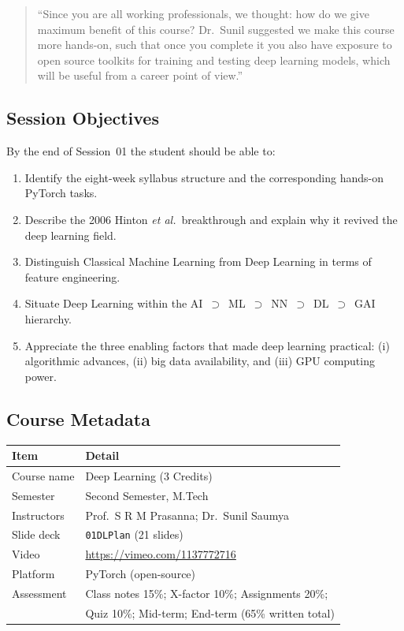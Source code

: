 \documentclass[12pt,a4paper]{article}
\begin{document}
\begin{quote}
``Since you are all working professionals, we thought: how do we give
maximum benefit of this course?  Dr.\ Sunil suggested we make this course
more hands-on, such that once you complete it you also have exposure to open
source toolkits for training and testing deep learning models, which will be
useful from a career point of view.''
\end{quote}

\subsection{Session Objectives}
\label{subsec:objectives}

By the end of Session~01 the student should be able to:
\begin{enumerate}[label=\textbf{O\arabic*.}]
  \item Identify the eight-week syllabus structure and the corresponding
        hands-on PyTorch tasks.
  \item Describe the 2006 Hinton \emph{et al.}\ breakthrough and explain why
        it revived the deep learning field.
  \item Distinguish Classical Machine Learning from Deep Learning in terms
        of feature engineering.
  \item Situate Deep Learning within the AI~$\supset$~ML~$\supset$~NN~$\supset$~DL~$\supset$~GAI hierarchy.
  \item Appreciate the three enabling factors that made deep learning
        practical: (i) algorithmic advances, (ii) big data availability, and
        (iii) GPU computing power.
\end{enumerate}

\subsection{Course Metadata}
\label{subsec:metadata}

\begin{center}
\begin{tabular}{ll}
\toprule
\textbf{Item} & \textbf{Detail} \\
\midrule
Course name   & Deep Learning (3 Credits) \\
Semester      & Second Semester, M.Tech \\
Instructors   & Prof.\ S R M Prasanna; Dr.\ Sunil Saumya \\
Slide deck    & \texttt{01DLPlan} (21 slides) \\
Video         & \url{https://vimeo.com/1137772716} \\
Platform      & PyTorch (open-source) \\
Assessment    & Class notes 15\%; X-factor 10\%; Assignments 20\%;\\
              & Quiz 10\%; Mid-term; End-term (65\% written total) \\
\bottomrule
\end{tabular}
\end{center}
\end{document}

